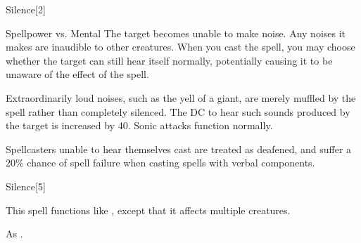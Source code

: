 \begin{spellsection}{Silence}[2]
    \begin{spellheader}
    \end{spellheader}
    \begin{spellcontent}
        \begin{spelltargetinginfo}
        \end{spelltargetinginfo}
        \begin{spelleffects}
            \begin{spellattack}{Spellpower vs. Mental}
                \spelleffect The target becomes unable to make noise. Any noises it makes are inaudible to other creatures. When you cast the spell, you may choose whether the target can still hear itself normally, potentially causing it to be unaware of the effect of the spell.

                Extraordinarily loud noises, such as the yell of a giant, are merely muffled by the spell rather than completely silenced. The DC to hear such sounds produced by the target is increased by 40. Sonic attacks function normally.
            \end{spellattack}
            \spelldur \durshort \dismissable
        \end{spelleffects}
    \end{spellcontent}
    \begin{spellfooter}
        \spellnotes Spellcasters unable to hear themselves cast are treated as deafened, and suffer a 20\% chance of spell failure when casting spells with verbal components.
        \miscastrandom
    \end{spellfooter}
\end{spellsection}

\begin{spellsection}[Mass]{Silence}[5]
    \begin{spellheader}
    \end{spellheader}
    \begin{spellcontent}
        \begin{spelltargetinginfo}
        \end{spelltargetinginfo}
        \begin{spelleffects}
            \spellspecial This spell functions like , except that it affects multiple creatures.
        \end{spelleffects}
    \end{spellcontent}
    \begin{spellfooter}
        \spellnotes As .
        \miscastexplode
    \end{spellfooter}
\end{spellsection}


